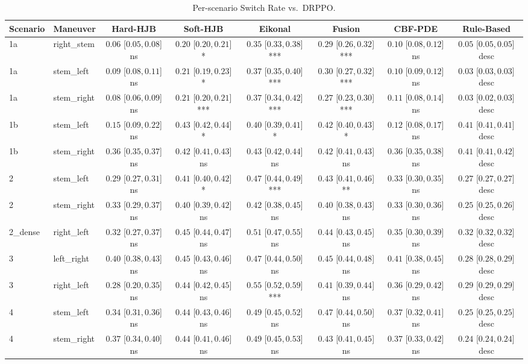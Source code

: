 \begin{table}[ht]
\centering
\caption{Per-scenario Switch Rate vs.\ DRPPO.}
\label{tab:per_scenario_switching_rate_mean}
\begin{tabular}{llcccccc}
\toprule
Scenario & Maneuver & Hard-HJB & Soft-HJB & Eikonal & Fusion & CBF-PDE & Rule-Based \\
\midrule
1a & right_stem & $0.06$ [$0.05, 0.08$] ns & $0.20$ [$0.20, 0.21$] * & $0.35$ [$0.33, 0.38$] *** & $0.29$ [$0.26, 0.32$] *** & $0.10$ [$0.08, 0.12$] ns & $0.05$ [$0.05, 0.05$] desc \\
1a & stem_left & $0.09$ [$0.08, 0.11$] ns & $0.21$ [$0.19, 0.23$] * & $0.37$ [$0.35, 0.40$] *** & $0.30$ [$0.27, 0.32$] *** & $0.10$ [$0.09, 0.12$] ns & $0.03$ [$0.03, 0.03$] desc \\
1a & stem_right & $0.08$ [$0.06, 0.09$] ns & $0.21$ [$0.20, 0.21$] *** & $0.37$ [$0.34, 0.42$] *** & $0.27$ [$0.23, 0.30$] *** & $0.11$ [$0.08, 0.14$] ns & $0.03$ [$0.02, 0.03$] desc \\
1b & stem_left & $0.15$ [$0.09, 0.22$] ns & $0.43$ [$0.42, 0.44$] * & $0.40$ [$0.39, 0.41$] * & $0.42$ [$0.40, 0.43$] * & $0.12$ [$0.08, 0.17$] ns & $0.41$ [$0.41, 0.41$] desc \\
1b & stem_right & $0.36$ [$0.35, 0.37$] ns & $0.42$ [$0.41, 0.43$] ns & $0.43$ [$0.42, 0.44$] ns & $0.42$ [$0.41, 0.43$] ns & $0.36$ [$0.35, 0.38$] ns & $0.41$ [$0.41, 0.42$] desc \\
2 & stem_left & $0.29$ [$0.27, 0.31$] ns & $0.41$ [$0.40, 0.42$] * & $0.47$ [$0.44, 0.49$] *** & $0.43$ [$0.41, 0.46$] ** & $0.33$ [$0.30, 0.35$] ns & $0.27$ [$0.27, 0.27$] desc \\
2 & stem_right & $0.33$ [$0.29, 0.37$] ns & $0.40$ [$0.39, 0.42$] ns & $0.42$ [$0.38, 0.45$] ns & $0.40$ [$0.38, 0.43$] ns & $0.33$ [$0.30, 0.36$] ns & $0.25$ [$0.25, 0.26$] desc \\
2_dense & right_left & $0.32$ [$0.27, 0.37$] ns & $0.45$ [$0.44, 0.47$] ns & $0.51$ [$0.47, 0.55$] ns & $0.44$ [$0.43, 0.45$] ns & $0.35$ [$0.30, 0.39$] ns & $0.32$ [$0.32, 0.32$] desc \\
3 & left_right & $0.40$ [$0.38, 0.43$] ns & $0.45$ [$0.43, 0.46$] ns & $0.47$ [$0.44, 0.50$] ns & $0.45$ [$0.44, 0.48$] ns & $0.41$ [$0.38, 0.45$] ns & $0.28$ [$0.28, 0.29$] desc \\
3 & right_left & $0.28$ [$0.20, 0.35$] ns & $0.44$ [$0.42, 0.45$] ns & $0.55$ [$0.52, 0.59$] *** & $0.41$ [$0.39, 0.44$] ns & $0.36$ [$0.29, 0.42$] ns & $0.29$ [$0.29, 0.29$] desc \\
4 & stem_left & $0.34$ [$0.31, 0.36$] ns & $0.44$ [$0.43, 0.46$] ns & $0.49$ [$0.45, 0.52$] ns & $0.47$ [$0.44, 0.50$] ns & $0.37$ [$0.32, 0.41$] ns & $0.25$ [$0.25, 0.25$] desc \\
4 & stem_right & $0.37$ [$0.34, 0.40$] ns & $0.44$ [$0.41, 0.46$] ns & $0.49$ [$0.45, 0.53$] ns & $0.43$ [$0.41, 0.45$] ns & $0.37$ [$0.33, 0.42$] ns & $0.24$ [$0.24, 0.24$] desc \\
\bottomrule
\end{tabular}
\end{table}
